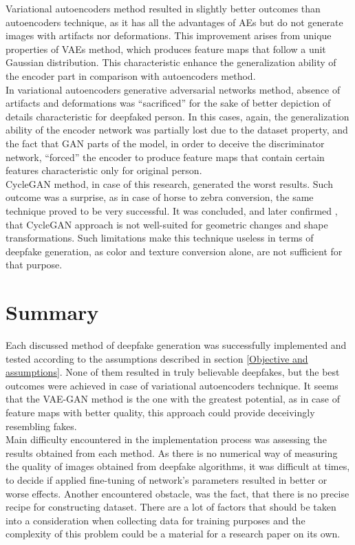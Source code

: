 Variational autoencoders method resulted in slightly better outcomes than autoencoders technique, as it has all the advantages of AEs but do not generate images with artifacts nor deformations. This improvement arises from unique
properties of VAEs method, which produces feature maps that follow a unit Gaussian distribution. This characteristic enhance the generalization ability of the encoder part in comparison with autoencoders method.\\

In variational autoencoders generative adversarial networks method, absence of artifacts and deformations was ``sacrificed'' for the sake of better depiction of details characteristic for deepfaked person. In this cases, again, the generalization ability of the encoder network was partially lost due to the dataset property, and the fact that GAN parts of the model, in order to deceive the discriminator network, ``forced'' the encoder to produce feature maps that contain certain features characteristic only for original person.\\

CycleGAN method, in case of this research, generated the worst results. Such outcome was a surprise, as in case of horse to zebra conversion, the same technique proved to be very successful. It was concluded, and later confirmed \cite{cycleGAN_6_bib}, that CycleGAN approach is not well-suited for geometric changes and shape transformations. Such limitations make this technique useless in terms of deepfake generation, as color and texture conversion alone, are not sufficient for that purpose.

\section{Summary}
Each discussed method of deepfake generation was successfully implemented and tested according to the assumptions described in section \ref{Objective and assumptions}. None of them resulted in truly believable deepfakes, but the best outcomes were achieved in case of variational autoencoders technique. It seems that the VAE-GAN method is the one with the greatest potential, as in case of feature maps with better quality, this approach could provide deceivingly resembling fakes.\\

Main difficulty encountered in the implementation process was assessing the results obtained from each method. As there is no numerical way of measuring the quality of images obtained from deepfake algorithms, it was difficult at times, to decide if applied fine-tuning of network's parameters resulted in better or worse effects. Another encountered obstacle, was the fact, that there is no precise recipe for constructing dataset. There are a lot of factors that should be taken into a consideration when collecting data for training purposes and the complexity of this problem could be a material for a research paper on its own.\\

